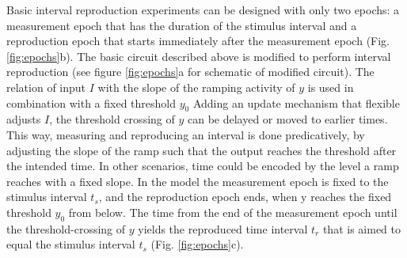 \documentclass[9pt]{article}
\begin{document}
Basic interval reproduction experiments can be designed with only two epochs: a measurement epoch that has the duration of the stimulus interval and a reproduction epoch that starts immediately after the measurement epoch (Fig. \ref{fig:epochs}b). 
The basic circuit described above is modified to perform interval reproduction (see figure \ref{fig:epochs}a for schematic of modified circuit).
The relation of input $I$ with the slope of the ramping activity of $y$ is used in combination with a fixed threshold $y_0$
Adding an update mechanism that flexible adjusts $I$, the threshold crossing of $y$ can be delayed or moved to earlier times.
This way, measuring and reproducing an interval is done predicatively, by adjusting the slope of the ramp such that the output reaches the threshold after the intended time. In other scenarios, time could be encoded by the level a ramp reaches with a fixed slope.
In the model the measurement epoch is fixed to the stimulus interval $t_s$, and the reproduction epoch ends, when y reaches the fixed threshold $y_0$ from below. 
The time from the end of the measurement epoch until the threshold-crossing of $y$ yields the reproduced time interval $t_r$ that is aimed to equal the stimulus interval $t_s$ (Fig. \ref{fig:epochs}c).
\end{document}
